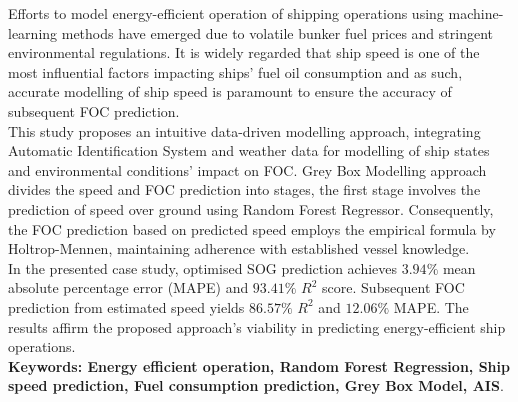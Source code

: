 Efforts to model energy-efficient operation of shipping operations using machine-learning methods have emerged due to volatile bunker fuel prices and stringent environmental regulations. It is widely regarded that ship speed is one of the most influential factors impacting ships' fuel oil consumption and as such, accurate modelling of ship speed is paramount to ensure the accuracy of subsequent FOC prediction.\\

This study proposes an intuitive data-driven modelling approach, integrating Automatic Identification System and weather data for modelling of ship states and environmental conditions' impact on FOC. Grey Box Modelling approach divides the speed and FOC prediction into stages, the first stage involves the prediction of speed over ground using Random Forest Regressor. Consequently, the FOC prediction based on predicted speed employs the empirical formula by Holtrop-Mennen, maintaining adherence with established vessel knowledge.\\
  
In the presented case study, optimised SOG prediction achieves $3.94\%$ mean absolute percentage error (MAPE) and $93.41\%$ $R^2$ score. Subsequent FOC prediction from estimated speed yields $86.57\%$ $R^2$ and $12.06\%$ MAPE. The results affirm the proposed approach's viability in predicting energy-efficient ship operations.\\


\textbf{\small Keywords: Energy efficient operation, Random Forest Regression, Ship speed prediction, Fuel consumption prediction, Grey Box Model, AIS}.